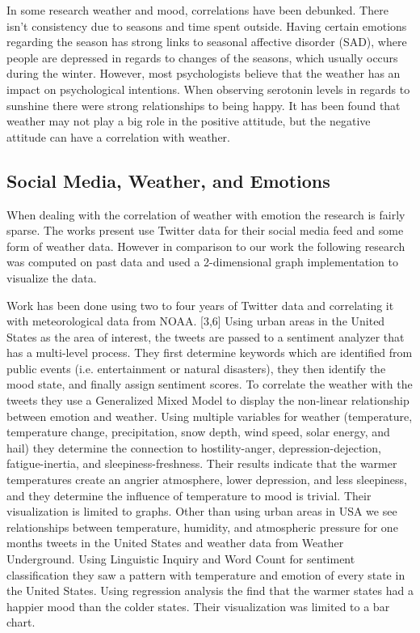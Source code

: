 \documentclass[journal]{vgtc}                %
\begin{document}
In some research weather and mood, correlations have been debunked. There isn't consistency due to seasons and time spent outside. \cite{denissen2008effects} Having certain emotions regarding the season has strong links to seasonal affective disorder (SAD),  where people are depressed in regards to changes of the seasons, which usually occurs during the winter. However, most psychologists believe that the weather has an impact on psychological intentions. \cite{hannak2012tweetin} When observing serotonin levels in regards to sunshine there were strong relationships to being happy. \cite{howarth1984multidimensional} It has been found that weather may not play a big role in the positive attitude, but the negative attitude can have a correlation with weather. \cite{lambert2002effect}


\subsection{Social Media, Weather, and Emotions}

When dealing with the correlation of weather with emotion the research is fairly sparse. The works present use Twitter data for their social media feed and some form of weather data. However in comparison to our work the following research was computed on past data and used a 2-dimensional graph implementation to visualize the data.
 
Work has been done using two to four years of Twitter data and correlating it with meteorological data from NOAA. [3,6] Using urban areas in the United States as the area of interest, the tweets are passed to a sentiment analyzer that has a multi-level process. They first determine keywords which are identified from public events (i.e. entertainment or natural disasters), they then identify the mood state, and finally assign sentiment scores. To correlate the weather with the tweets they use a Generalized Mixed Model to display the non-linear relationship between emotion and weather. Using multiple variables for weather (temperature, temperature change, precipitation, snow depth, wind speed, solar energy, and hail) they determine the connection to hostility-anger, depression-dejection, fatigue-inertia, and sleepiness-freshness.  Their results indicate that the warmer temperatures create an angrier atmosphere, lower depression, and less sleepiness, and they determine the influence of temperature to mood is trivial. Their visualization is limited to graphs. \cite{hannak2012tweetin}
Other than using urban areas in USA we see relationships between temperature, humidity, and atmospheric pressure for one months tweets in the United States and weather data from Weather Underground. Using Linguistic Inquiry and Word Count for sentiment classification they saw a pattern with temperature and emotion of every state in the United States. Using regression analysis the find that the warmer states had a happier mood than the colder states. Their visualization was limited to a bar chart.
\end{document}

